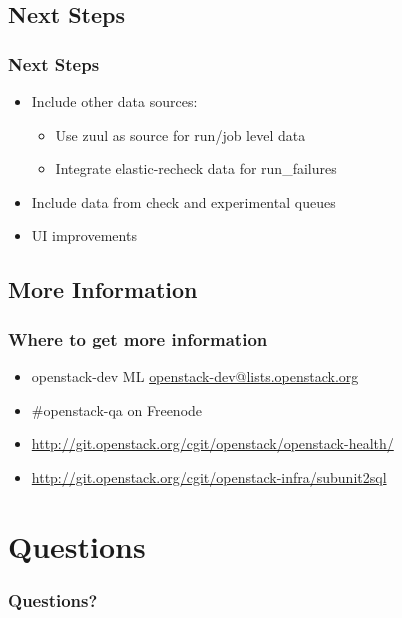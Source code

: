 \documentclass[aspectratio=169,11pt,hyperref={colorlinks=true}]{beamer}
\begin{document}
\subsection{Next Steps}
\begin{frame}
    \frametitle{Next Steps}
    \begin{itemize}
        \item Include other data sources:
            \begin{itemize}
                \item Use zuul as source for run/job level data
                \item Integrate elastic-recheck data for run\_failures
             \end{itemize}
        \item Include data from check and experimental queues
        \item UI improvements
    \end{itemize}
\end{frame}

\subsection{More Information}
\begin{frame}
\frametitle{Where to get more information}
    \begin{itemize}
        \item openstack-dev ML\: \href{mailto:openstack-dev@lists.openstack.org}{openstack-dev@lists.openstack.org}
        \item \#openstack-qa on Freenode
        \item \href{http://git.openstack.org/cgit/openstack/openstack-health/}{http://git.openstack.org/cgit/openstack/openstack-health/}
        \item \href{http://git.openstack.org/cgit/openstack-infra/subunit2sql}{http://git.openstack.org/cgit/openstack-infra/subunit2sql}
    \end{itemize}
\end{frame}

\section{Questions}
\begin{frame}
\frametitle{Questions?}
\end{frame}
\end{document}
